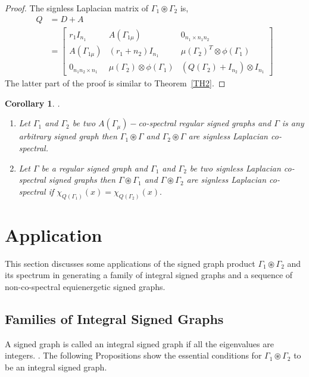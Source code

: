 \documentclass[12pt,a4paper]{article}
\newtheorem{corollary}{Corollary}[theorem]
\theoremstyle{definition}
\theoremstyle{remark}
\begin{document}
    \begin{proof}
        The signless Laplacian matrix of $\Gamma_1\circledast\Gamma_2$ is,\\
        \begin{equation*}
            \begin{split}
                Q&=D+A\\
                &=\begin{bmatrix}
                  r_1I_{n_1}& A(\Gamma_{1\mu})& 0_{n_1\times n_1n_2}\\ 
            A(\Gamma_{1\mu})& (r_1+n_2)I_{n_1}& \mu(\Gamma_2)^T\otimes\phi(\Gamma_1)\\
            0_{n_1n_2\times n_1}& \mu(\Gamma_2)\otimes\phi(\Gamma_1)& (Q(\Gamma_2)+I_{n_2})\otimes I_{n_1}
                \end{bmatrix}
            \end{split}
        \end{equation*}
        The latter part of the proof is similar to Theorem~\ref{TH2}.
    \end{proof}

    \begin{corollary}.\\ \vspace{-20pt}
         \begin{enumerate}
            \item Let $\Gamma_1$ and $\Gamma_2$ be two $A(\Gamma_{\mu})-$co-spectral regular signed graphs and $\Gamma$ is any arbitrary signed graph then $\Gamma_1\circledast\Gamma$ and $\Gamma_2\circledast\Gamma$ are signless Laplacian co-spectral.
            \item Let $\Gamma$ be a regular signed graph and $\Gamma_1$ and $\Gamma_2$ be two signless Laplacian co-spectral signed graphs then $\Gamma\circledast\Gamma_1$ and $\Gamma\circledast\Gamma_2$ are signless Laplacian co-spectral if $\chi_{Q(\Gamma_1)}(x)=\chi_{Q(\Gamma_2)}(x).$
        \end{enumerate}
    \end{corollary}

    \section{Application}
    This section discusses some applications of the signed graph product $\Gamma_1\circledast\Gamma_2$ and its spectrum in generating a family of integral signed graphs and a sequence of non-co-spectral equienergetic signed graphs.
    \subsection{Families of Integral Signed Graphs}
    A signed graph is called an integral signed graph if all the eigenvalues are integers. \cite {balinska2002survey,indulal2012spectrum}. The following Propositions show the essential conditions for $\Gamma_1\circledast\Gamma_2$ to be an integral signed graph.
\end{document}
